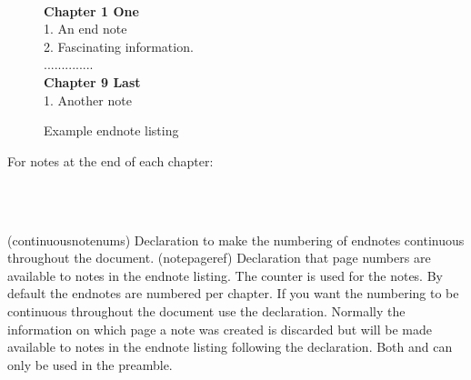 \begin{figure}
\centering
\begin{minipage}{0.8\textwidth}
\begin{framed}
\\[\baselineskip]
{\bfseries Chapter 1 One} \\[\baselineskip]
1. An end note \\
2. Fascinating information. \\
.............. \\[\baselineskip]
{\bfseries Chapter 9 Last} \\[\baselineskip]
1. Another note \\[\baselineskip]
\end{framed}
\end{minipage}
\caption{Example endnote listing}\label{fig:endnote}
\end{figure}

For notes at the end of each chapter:

\begin{syntax}
\cmd{\continuousnotenums} \\
\cmd{\notepageref} \\
\end{syntax}
\glossary(continuousnotenums)%
  {}%
  {Declaration to make the numbering of endnotes continuous throughout the
   document.}%
\glossary(notepageref)%
  {}%
  {Declaration that page numbers are available to notes in the endnote listing.}
   The  counter is used for the notes. By default the endnotes 
are numbered per chapter. If you want the numbering
to be continuous throughout the document use the \cmd{\continuousnotenums}
declaration. Normally the information on which page a note was created is
discarded but will be made available to notes in the endnote listing
following the \cmd{\notepageref} declaration.  Both
\cmd{\continuousnotenums} and \cmd{\notepageref} can only be used in
the preamble.

